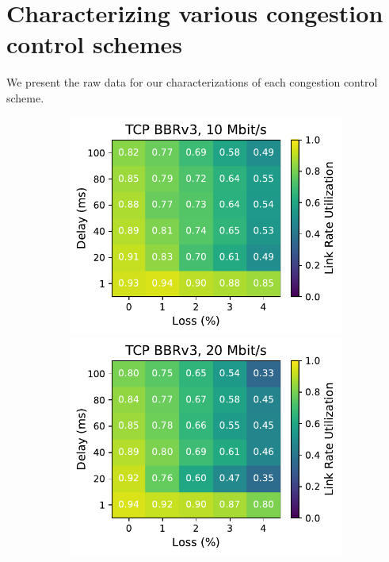 \section{Characterizing various congestion control schemes}
\label{sec:appendix:heatmaps}

We present the raw data for our characterizations of each
congestion control scheme.

\begin{figure}[ht]
    \centering
    \begin{subfigure}[b]{0.22\linewidth}
        \includegraphics[width=\linewidth,trim={0 0 2cm 0},clip]{splitting-paper/figures/heatmaps/heatmap_tcp_bbr3_10mbps.pdf}
        \includegraphics[width=\linewidth,trim={0 0 2cm 0},clip]{splitting-paper/figures/heatmaps/heatmap_tcp_bbr3_20mbps.pdf}

\end{subfigure}
\end{figure}
